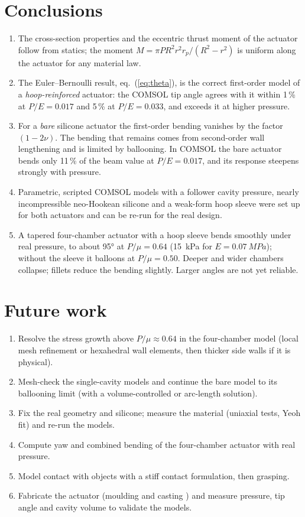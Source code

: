 \documentclass[12pt,a4paper,oneside]{report}
\numberwithin{equation}{chapter}
\numberwithin{figure}{chapter}
\numberwithin{table}{chapter}
\newcommand{\rp}{r_p}
\begin{document}
\section{Conclusions}
\begin{enumerate}
\item The cross-section properties and the eccentric thrust moment of the actuator follow from statics; the
moment $M=\pi PR^2r^2\rp/(R^2-r^2)$ is uniform along the actuator for any material law.
\item The Euler--Bernoulli result, eq.~(\ref{eq:theta}), is the correct first-order model of a
\emph{hoop-reinforced} actuator: the COMSOL tip angle agrees with it within 1\,\% at $P/E=0.017$ and 5\,\% at
$P/E=0.033$, and exceeds it at higher pressure.
\item For a \emph{bare} silicone actuator the first-order bending vanishes by the factor $(1-2\nu)$. The bending
that remains comes from second-order wall lengthening and is limited by ballooning. In COMSOL the bare
actuator bends only 11\,\% of the beam value at $P/E=0.017$, and its response steepens strongly with pressure.
\item Parametric, scripted COMSOL models with a follower cavity pressure, nearly incompressible neo-Hookean
silicone and a weak-form hoop sleeve were set up for both actuators and can be re-run for the real design.
\item A tapered four-chamber actuator with a hoop sleeve bends smoothly under real pressure, to about \ang{95} at
$P/\mu=0.64$ (\SI{15}{kPa} for $E=\SI{0.07}{MPa}$); without the sleeve it balloons at $P/\mu=0.50$. Deeper and
wider chambers collapse; fillets reduce the bending slightly. Larger angles are not yet reliable.
\end{enumerate}

\section{Future work}
\begin{enumerate}
\item Resolve the stress growth above $P/\mu\approx0.64$ in the four-chamber model (local mesh refinement or
hexahedral wall elements, then thicker side walls if it is physical).
\item Mesh-check the single-cavity models and continue the bare model to its ballooning limit (with a
volume-controlled or arc-length solution).
\item Fix the real geometry and silicone; measure the material (uniaxial tests, Yeoh fit) and re-run the models.
\item Compute yaw and combined bending of the four-chamber actuator with real pressure.
\item Model contact with objects with a stiff contact formulation, then grasping.
\item Fabricate the actuator (moulding and casting \cite{marchese2015}) and measure pressure, tip angle and cavity
volume to validate the models.
\end{enumerate}
\end{document}
